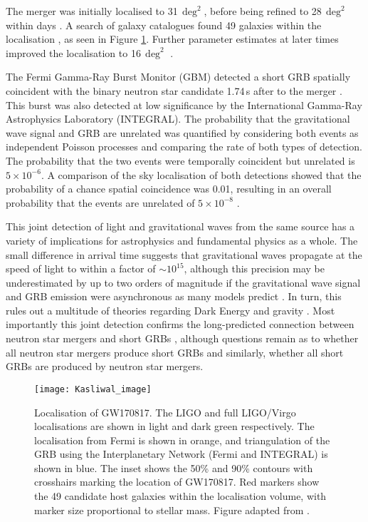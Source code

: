 The merger was initially localised to 31$\,\deg^2$, before being refined to 28$\,\deg^2$ within days \citep{2017PhRvL.119p1101A}. A search of galaxy catalogues found 49 galaxies within the localisation \citep{2017Sci...358.1559K}, as seen in Figure \ref{fig:gw170817_localisation}. Further parameter estimates at later times improved the localisation to 16$\,\deg^2$ \citep{2019PhRvX...9a1001A}.

The Fermi Gamma-Ray Burst Monitor (GBM) detected a short GRB spatially coincident with the binary neutron star candidate 1.74\,s after to the merger \citep{2017ApJ...848L..14G,2017ApJ...848L..13A}. This burst was also detected at low significance \citep{2017ApJ...848L..15S} by the International Gamma-Ray Astrophysics Laboratory (INTEGRAL). The probability that the gravitational wave signal and GRB are unrelated was quantified by considering both events as independent Poisson processes and comparing the rate of both types of detection. The probability that the two events were temporally coincident but unrelated is $5\times 10^{-6}$. A comparison of the sky localisation of both detections showed that the probability of a chance spatial coincidence was 0.01, resulting in an overall probability that the events are unrelated of $5\times 10^{-8}$ \citep{2017ApJ...848L..13A}.

This joint detection of light and gravitational waves from the same source has a variety of implications for astrophysics and fundamental physics as a whole. The small difference in arrival time suggests that gravitational waves propagate at the speed of light to within a factor of $\sim 10^{15}$, although this precision may be underestimated by up to two orders of magnitude if the gravitational wave signal and GRB emission were asynchronous as many models predict \citep[e.g.][]{2017ApJ...850L..24G,2018ApJ...867...18N,2020ApJ...898...59L}. In turn, this rules out a multitude of theories regarding Dark Energy \citep{2017PhRvL.119y1304E} and gravity \citep{2018IJMPD..2747027S,2019PhRvL.123a1102A}. Most importantly this joint detection confirms the long-predicted connection between neutron star mergers and short GRBs \citep{1986ApJ...308L..43P,1989Natur.340..126E,1992ApJ...395L..83N}, although questions remain as to whether all neutron star mergers produce short GRBs and similarly, whether all short GRBs are produced by neutron star mergers.

\begin{figure}
    \centering
    \texttt{[image: Kasliwal\_image]}
    \caption[Localisation of GW170817]{Localisation of GW170817. The LIGO and full LIGO/Virgo localisations are shown in light and dark green respectively. The localisation from Fermi is shown in orange, and triangulation of the GRB using the Interplanetary Network (Fermi and INTEGRAL) is shown in blue. The inset shows the 50\% and 90\% contours with crosshairs marking the location of GW170817. Red markers show the 49 candidate host galaxies within the localisation volume, with marker size proportional to stellar mass. Figure adapted from \citet{2017Sci...358.1559K}.}
    \label{fig:gw170817_localisation}
\end{figure}

